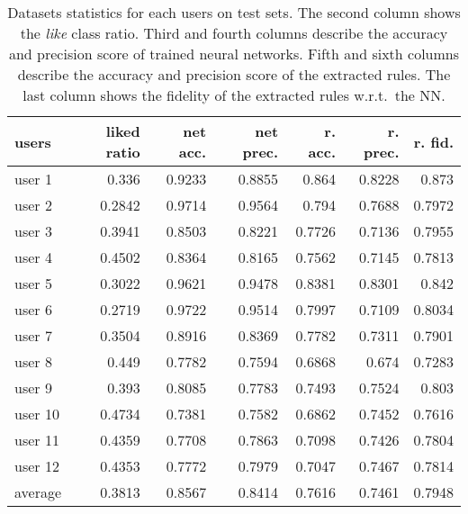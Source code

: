 \begin{table}%
    \centering
    \caption[Datasets statistics for each users on test sets.]{
        Datasets statistics for each users on test sets.
        The second column shows the \emph{like} class ratio.
        Third and fourth columns describe the accuracy and precision score of trained neural networks.
        Fifth and sixth columns describe the accuracy and precision score of the extracted rules.
        The last column shows the fidelity of the extracted rules w.r.t.\ the NN.
    }
        \begin{tabular}{l||r|r|r|r|r|r}
            \textbf{users} & \textbf{liked ratio} & \textbf{net acc.} & \textbf{net prec.} & \textbf{r. acc.} & \textbf{r. prec.} & \textbf{r. fid.}\\
            \hline\hline
            user 1 & 0.336 & 0.9233 & 0.8855 & 0.864 & 0.8228 & 0.873\\
            user 2 & 0.2842 & 0.9714 & 0.9564 & 0.794 & 0.7688 & 0.7972\\
            user 3 & 0.3941 & 0.8503 & 0.8221 & 0.7726 & 0.7136 & 0.7955\\
            user 4 & 0.4502 & 0.8364 & 0.8165 & 0.7562 & 0.7145 & 0.7813\\
            user 5 & 0.3022 & 0.9621 & 0.9478 & 0.8381 & 0.8301 & 0.842\\
            user 6 & 0.2719 & 0.9722 & 0.9514 & 0.7997 & 0.7109 & 0.8034\\
            user 7 & 0.3504 & 0.8916 & 0.8369 & 0.7782 & 0.7311 & 0.7901\\
            user 8 & 0.449 & 0.7782 & 0.7594 & 0.6868 & 0.674 & 0.7283\\
            user 9 & 0.393 & 0.8085 & 0.7783 & 0.7493 & 0.7524 & 0.803\\
            user 10 & 0.4734 & 0.7381 & 0.7582 & 0.6862 & 0.7452 & 0.7616\\
            user 11 & 0.4359 & 0.7708 & 0.7863 & 0.7098 & 0.7426 & 0.7804\\
            user 12 & 0.4353 & 0.7772 & 0.7979 & 0.7047 & 0.7467 & 0.7814\\
            \hline\hline
            average & 0.3813 & 0.8567 & 0.8414 & 0.7616 & 0.7461 & 0.7948\\
        \end{tabular}
\label{tab:net-rules-stats}
\end{table}